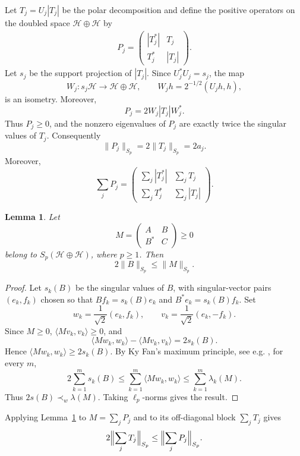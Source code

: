 \documentclass[10pt,a4paper]{amsart}
\newtheorem{lemma}[theorem]{Lemma}
\newcommand{\1}{\mathbf{1}}
\begin{document}
Let $T_j=U_j|T_j|$ be the polar decomposition and define the positive operators on the doubled space $\mathcal{H}\oplus\mathcal{H}$ by
\begin{align}\label{dadeb}
P_j=\begin{pmatrix}|T_j^*|&T_j\\T_j^*&|T_j|\end{pmatrix}.
\end{align}
Let $s_j$ be the support projection of $|T_j|$. Since $U_j^*U_j=s_j$, the map
\[
W_j:s_j\mathcal H\to \mathcal H\oplus\mathcal H,\qquad
W_jh=2^{-1/2}(U_jh,h),
\]
is an isometry. Moreover,
\[
P_j=2W_j|T_j|W_j^*.
\]
Thus $P_j\ge0$, and the nonzero eigenvalues of $P_j$ are exactly twice the
singular values of $T_j$. Consequently
\[
\|P_j\|_{S_p}=2\|T_j\|_{S_p}=2a_j.
\]
Moreover,
\[
\sum_j P_j=\begin{pmatrix}\sum_j|T_j^*|&\sum_j T_j\\\sum_j T_j^*&\sum_j|T_j|\end{pmatrix}.
\]


\begin{lemma}\label{lem:offdiag}
Let
\[
M=\begin{pmatrix}A&B\\B^*&C\end{pmatrix}\ge0
\]
belong to $S_p(\mathcal H\oplus\mathcal H)$, where $p\ge1$. Then
\[
2\|B\|_{S_p}\le \|M\|_{S_p}.
\]
\end{lemma}

\begin{proof}
Let $s_k(B)$ be the singular values of $B$, with singular-vector pairs
$(e_k,f_k)$ chosen so that $Bf_k=s_k(B)e_k$ and $B^*e_k=s_k(B)f_k$. Set
\[
w_k=\frac{1}{\sqrt2}(e_k,f_k),\qquad
v_k=\frac{1}{\sqrt2}(e_k,-f_k).
\]
Since $M\ge0$, $\langle Mv_k,v_k\rangle\ge0$, and
\[
\langle Mw_k,w_k\rangle-\langle Mv_k,v_k\rangle=2s_k(B).
\]
Hence $\langle Mw_k,w_k\rangle\ge 2s_k(B)$. By Ky Fan's maximum principle, see e.g. \cite[Chapter III]{BhatiaMatrixAnalysis}, 
for every $m$,
\[
2\sum_{k=1}^m s_k(B)
\le
\sum_{k=1}^m\langle Mw_k,w_k\rangle
\le
\sum_{k=1}^m \lambda_k(M).
\]
Thus $2s(B)\prec_w \lambda(M)$. Taking $\ell_p$-norms gives the result.
\end{proof}

Applying Lemma~\ref{lem:offdiag} to $M=\sum_j P_j$ and to its off-diagonal
block $\sum_j T_j$ gives
\[
2\Bigl\|\sum_j T_j\Bigr\|_{S_p}\leq\Bigl\|\sum_j P_j\Bigr\|_{S_p}.
\]
\end{document}
